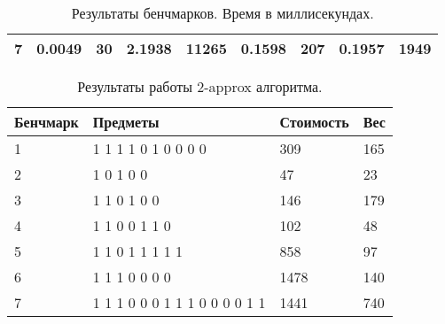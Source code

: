 \documentclass{article}
\begin{document}
\begin{table}[!h]
\begin{center}
\begin{tabular}{ | m{4.1em} | m{3em} | m{4.5em} | m{3em} | m{4.5em} | m{3em} | m{4.5em}| m{3em} | m{4.5em}|}
            \hline
            7        & 0.0049                               & 30                                      & 2.1938                                 & 11265                             & 0.1598 & 207       & 0.1957 & 1949      \\
            \hline
        \end{tabular}
        \caption{Результаты бенчмарков. Время в миллисекундах.}
    \end{center}
\end{table}

\begin{table}[!h]
    \begin{center}
        \begin{tabular}{ | m{4.1em} | m{15em} | m{4.5em} | m{4.5em} |}
            \hline
            Бенчмарк & Предметы                      & Стоимость & Вес \\
            \hline
            1        & 1 1 1 1 0 1 0 0 0 0           & 309       & 165 \\
            \hline
            2        & 1 0 1 0 0                     & 47        & 23  \\
            \hline
            3        & 1 1 0 1 0 0                   & 146       & 179 \\
            \hline
            4        & 1 1 0 0 1 1 0                 & 102       & 48  \\
            \hline
            5        & 1 1 0 1 1 1 1 1               & 858       & 97  \\
            \hline
            6        & 1 1 1 0 0 0 0                 & 1478      & 140 \\
            \hline
            7        & 1 1 1 0 0 0 1 1 1 0 0 0 0 1 1 & 1441      & 740 \\
            \hline
        \end{tabular}
        \caption{Результаты работы 2-approx алгоритма.}
    \end{center}
\end{table}
\end{document}
